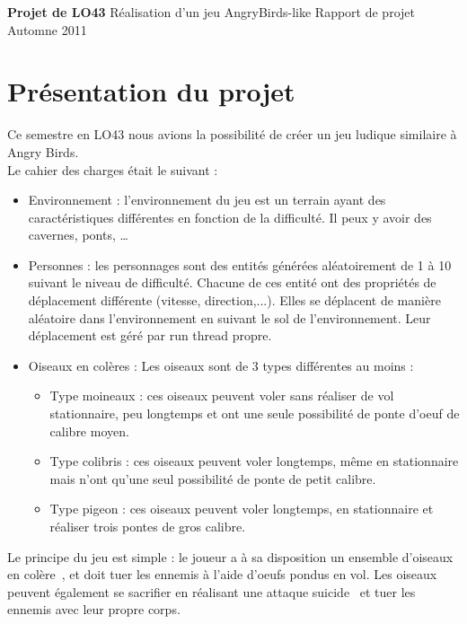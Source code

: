 \documentclass[a4paper,12pt]{report}
\begin{document}
{\textbf{Projet de LO43}} %
{Réalisation d'un jeu AngryBirds-like} %
{Rapport de projet} %
{Automne 2011} %
{} %
{} %

\tableofcontents
\chapter{Présentation du projet}
Ce semestre en LO43 nous avions la possibilité de créer un jeu ludique similaire à Angry Birds.\\
Le cahier des charges était le suivant :
\begin{itemize}
  \item Environnement : l'environnement du jeu est un terrain ayant des caractéristiques différentes en fonction de la difficulté. Il peux y avoir des cavernes, ponts, …
  \item Personnes : les personnages sont des entités générées aléatoirement de 1 à 10 suivant le niveau de difficulté. Chacune de ces entité ont des propriétés de déplacement différente (vitesse, direction,...). Elles se déplacent de manière aléatoire dans l'environnement en suivant le sol de l'environnement. Leur déplacement est géré par run thread propre.
  \item Oiseaux en colères : Les oiseaux sont de 3 types différentes au moins :
    \begin{itemize}
      \item Type moineaux : ces oiseaux peuvent voler sans réaliser de vol stationnaire, peu longtemps et ont une seule possibilité de ponte d'oeuf de calibre moyen.
      \item Type colibris : ces oiseaux peuvent voler longtemps, même en stationnaire mais n'ont qu'une seul possibilité de ponte de petit calibre.
      \item Type pigeon : ces oiseaux peuvent voler longtemps, en stationnaire et réaliser trois pontes de gros calibre.
    \end{itemize}
\end{itemize}

Le principe du jeu est simple : le joueur a à sa disposition un ensemble d'oiseaux \guillemotleft en colère\guillemotright~,
et doit tuer les ennemis à l'aide d'oeufs pondus en vol. Les oiseaux peuvent également se sacrifier
en réalisant une \guillemotleft attaque suicide\guillemotright~ et tuer les ennemis avec leur propre corps.\\
\end{document}
